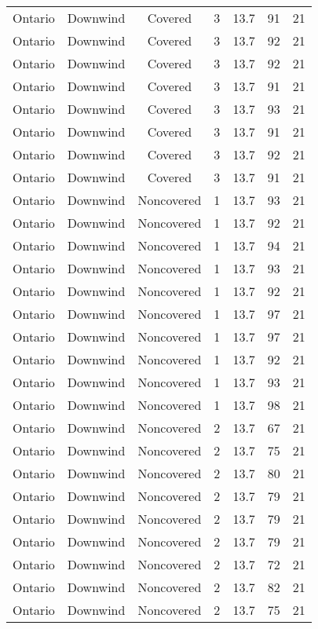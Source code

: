 \documentclass{article}
\begin{document}
\begin{longtable}[H]{ccccccc}
Ontario & Downwind & Covered     & 3 & 13.7 & 91  & 21 \\
Ontario & Downwind & Covered     & 3 & 13.7 & 92  & 21 \\
Ontario & Downwind & Covered     & 3 & 13.7 & 92  & 21 \\
Ontario & Downwind & Covered     & 3 & 13.7 & 91  & 21 \\
Ontario & Downwind & Covered     & 3 & 13.7 & 93  & 21 \\
Ontario & Downwind & Covered     & 3 & 13.7 & 91  & 21 \\
Ontario & Downwind & Covered     & 3 & 13.7 & 92  & 21 \\
Ontario & Downwind & Covered     & 3 & 13.7 & 91  & 21 \\
Ontario & Downwind & Noncovered & 1 & 13.7 & 93  & 21 \\
Ontario & Downwind & Noncovered & 1 & 13.7 & 92  & 21 \\
Ontario & Downwind & Noncovered & 1 & 13.7 & 94  & 21 \\
Ontario & Downwind & Noncovered & 1 & 13.7 & 93  & 21 \\
Ontario & Downwind & Noncovered & 1 & 13.7 & 92  & 21 \\
Ontario & Downwind & Noncovered & 1 & 13.7 & 97  & 21 \\
Ontario & Downwind & Noncovered & 1 & 13.7 & 97  & 21 \\
Ontario & Downwind & Noncovered & 1 & 13.7 & 92  & 21 \\
Ontario & Downwind & Noncovered & 1 & 13.7 & 93  & 21 \\
Ontario & Downwind & Noncovered & 1 & 13.7 & 98  & 21 \\
Ontario & Downwind & Noncovered & 2 & 13.7 & 67  & 21 \\
Ontario & Downwind & Noncovered & 2 & 13.7 & 75  & 21 \\
Ontario & Downwind & Noncovered & 2 & 13.7 & 80  & 21 \\
Ontario & Downwind & Noncovered & 2 & 13.7 & 79  & 21 \\
Ontario & Downwind & Noncovered & 2 & 13.7 & 79  & 21 \\
Ontario & Downwind & Noncovered & 2 & 13.7 & 79  & 21 \\
Ontario & Downwind & Noncovered & 2 & 13.7 & 72  & 21 \\
Ontario & Downwind & Noncovered & 2 & 13.7 & 82  & 21 \\
Ontario & Downwind & Noncovered & 2 & 13.7 & 75  & 21 \\

\end{longtable}
\end{document}
